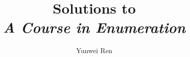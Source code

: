 

\title{Solutions to\\ \textit{A Course in Enumeration}}
\author{Yunwei Ren}
\date{}


\maketitle
\tableofcontents

\newpage




